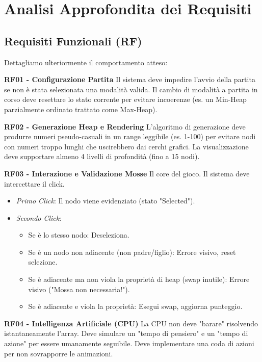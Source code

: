 \documentclass[openany]{theme/uniprthesis}
\begin{document}
\section{Analisi Approfondita dei Requisiti}

\subsection{Requisiti Funzionali (RF)}
Dettagliamo ulteriormente il comportamento atteso:

\noindent
\textbf{RF01 - Configurazione Partita}
Il sistema deve impedire l'avvio della partita se non è stata selezionata una modalità valida. Il cambio di modalità a partita in corso deve resettare lo stato corrente per evitare incoerenze (es. un Min-Heap parzialmente ordinato trattato come Max-Heap).

\noindent
\textbf{RF02 - Generazione Heap e Rendering}
L'algoritmo di generazione deve produrre numeri pseudo-casuali in un range leggibile (es. 1-100) per evitare nodi con numeri troppo lunghi che uscirebbero dai cerchi grafici. La visualizzazione deve supportare almeno 4 livelli di profondità (fino a 15 nodi).

\noindent
\textbf{RF03 - Interazione e Validazione Mosse}
Il core del gioco. Il sistema deve intercettare il click.
\begin{itemize}
    \item \textit{Primo Click}: Il nodo viene evidenziato (stato "Selected").
    \item \textit{Secondo Click}:
    \begin{itemize}
        \item Se è lo stesso nodo: Deseleziona.
        \item Se è un nodo non adiacente (non padre/figlio): Errore visivo, reset selezione.
        \item Se è adiacente ma non viola la proprietà di heap (swap inutile): Errore visivo ("Mossa non necessaria!").
        \item Se è adiacente e viola la proprietà: Esegui swap, aggiorna punteggio.
    \end{itemize}
\end{itemize}

\noindent
\textbf{RF04 - Intelligenza Artificiale (CPU)}
La CPU non deve "barare" risolvendo istantaneamente l'array. Deve simulare un "tempo di pensiero" e un "tempo di azione" per essere umanamente seguibile. Deve implementare una coda di azioni per non sovrapporre le animazioni.
\end{document}
